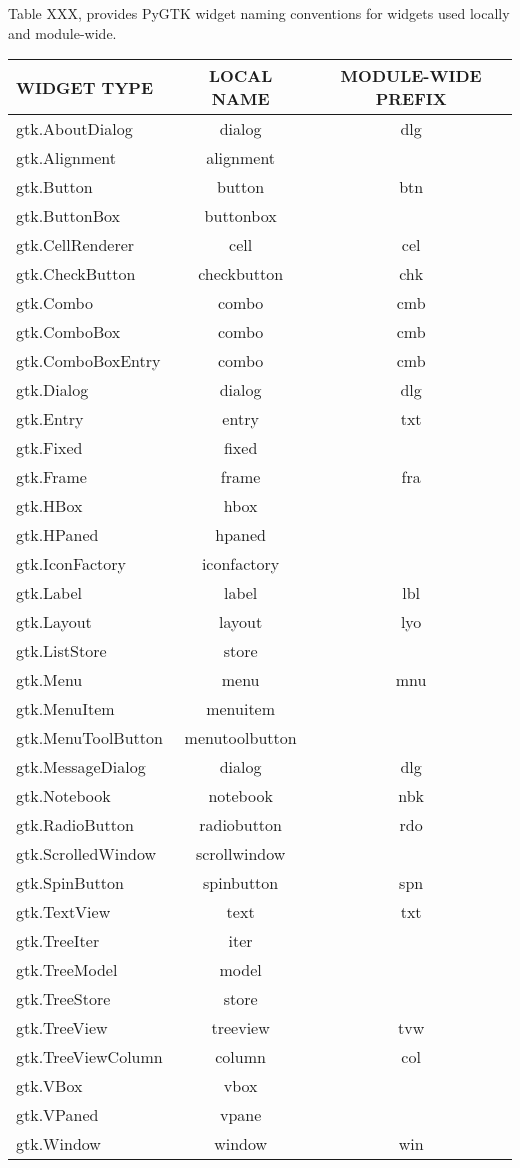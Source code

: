 \documentclass[11pt, 12pt, twoside, onecolumn]{article}
\begin{document}
Table XXX, provides PyGTK widget naming conventions for widgets used locally and module-wide. \\

    \begin{landscape}
    \begin{longtable}{lcc}
    WIDGET TYPE & LOCAL NAME & MODULE-WIDE PREFIX \\
    \hline
    gtk.AboutDialog & dialog & dlg \\
    gtk.Alignment & alignment & \\
    gtk.Button & button & btn \\
    gtk.ButtonBox & buttonbox & \\
    gtk.CellRenderer & cell & cel \\
    gtk.CheckButton & checkbutton & chk \\
    gtk.Combo & combo & cmb \\
    gtk.ComboBox & combo & cmb \\
    gtk.ComboBoxEntry & combo & cmb \\
    gtk.Dialog & dialog & dlg \\
    gtk.Entry & entry & txt \\
    gtk.Fixed & fixed & \\
    gtk.Frame & frame & fra \\
    gtk.HBox & hbox & \\
    gtk.HPaned & hpaned & \\
    gtk.IconFactory & iconfactory & \\
    gtk.Label & label & lbl \\
    gtk.Layout & layout & lyo \\
    gtk.ListStore & store & \\
    gtk.Menu & menu & mnu \\
    gtk.MenuItem & menuitem & \\
    gtk.MenuToolButton & menutoolbutton & \\
    gtk.MessageDialog & dialog & dlg \\
    gtk.Notebook & notebook & nbk \\
    gtk.RadioButton & radiobutton & rdo \\
    gtk.ScrolledWindow & scrollwindow & \\
    gtk.SpinButton & spinbutton & spn \\
    gtk.TextView & text & txt \\
    gtk.TreeIter & iter & \\
    gtk.TreeModel & model & \\
    gtk.TreeStore & store & \\
    gtk.TreeView & treeview & tvw \\
    gtk.TreeViewColumn & column & col \\
    gtk.VBox & vbox & \\
    gtk.VPaned & vpane & \\
    gtk.Window & window & win \\
    \hline
    \end{longtable}
    \end{landscape}
\end{document}
